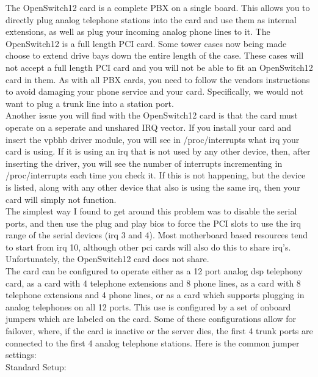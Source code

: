 \documentclass[a4paper,12pt]{article}
\begin{document}
The OpenSwitch12 card is a complete PBX on a single board.  This allows
you to directly plug analog telephone stations into the card and use them
as internal extensions, as well as plug your incoming analog phone lines
to it.  The OpenSwitch12 is a full length PCI card.  Some tower cases now
being made choose to extend drive bays down the entire length of the case.
These cases will not accept a full length PCI card and you will not be
able to fit an OpenSwitch12 card in them.  As with all PBX cards, you need
to follow the vendors instructions to avoid damaging your phone service
and your card.  Specifically, we would not want to plug a trunk line into
a station port. \\

Another issue you will find with the OpenSwitch12 card is that the card
must operate on a seperate and unshared IRQ vector.  If you install your
card and insert the vpbhb driver module, you will see in /proc/interrupts
what irq your card is using.  If it is using an irq that is not used by
any other device, then, after inserting the driver, you will see the
number of interrupts incrementing in /proc/interrupts each time you check
it.  If this is not happening, but the device is listed, along with any
other device that also is using the same irq, then your card will simply
not function. \\

The simplest way I found to get around this problem was to disable the
serial ports, and then use the plug and play bios to force the PCI slots
to use the irq range of the serial devices (irq 3 and 4).  Most
motherboard based resources tend to start from irq 10, although other
pci cards will also do this to share irq's.  Unfortunately, the
OpenSwitch12 card does not share. \\

The card can be configured to operate either as a 12 port analog dsp
telephony card, as a card with 4 telephone extensions and 8 phone lines,
as a card with 8 telephone extensions and 4 phone lines, or as a card
which supports plugging in analog telephones on all 12 ports.  This use is
configured by a set of onboard jumpers which are labeled on the card.
Some of these configurations allow for failover, where, if the card is
inactive or the server dies, the first 4 trunk ports are connected to the
first 4 analog telephone stations.  Here is the common jumper settings: \\

\noindent
Standard Setup: \\
\end{document}
